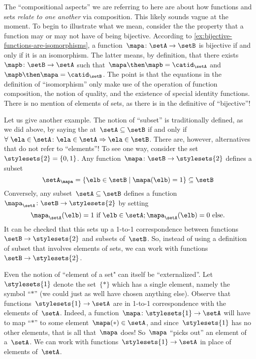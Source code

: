 The ``compositional aspects'' we are referring to here are about how functions and sets \emph{relate to one another} via composition.
This likely sounds vague at the moment.
To begin to illustrate what we mean, consider the the property that a function may or may not have of being bijective.
According to \cref{ex:bijective-functions-are-isomorphisms}, a function~$\mapa\colon \setA \to \setB$ is bijective if and only if it is an isomorphism.
The latter means, by definition, that there exists~$\mapb \colon \setB \to \setA$ such that~$\mapa \then \mapb = \catid_\setA$ and~$\mapb \then \mapa = \catid_\setB$.
The point is that the equations in the definition of ``isomorphism'' only make use of the operation of function composition, the notion of quality, and the existence of special identity functions.
There is no mention of elements of sets, as there is in the definitive of ``bijective''!

Let us give another example.
The notion of ``subset'' is traditionally defined, as we did above, by saying the at~$\setA \subseteq \setB$ if and only if~$\forall \ \ela \in \setA \colon \ela \in \setA \Rightarrow \ela \in \setB$.
There are, however, alternatives that do not refer to ``elements''!
To see one way, consider the set~$\stylesets{2} = \{ 0, 1\}$.
Any function~$\mapa \colon \setB \to \stylesets{2}$ defines a subset
\begin{equation*}
    \setA_\mapa = \{ \elb \in \setB \mid \mapa(\elb) = 1 \} \subseteq \setB
\end{equation*}
Conversely, any subset~$\setA \subseteq \setB$ defines a function~$\mapa_\setA \colon \setB \to \stylesets{2}$ by setting
\begin{equation*}
    \mapa_\setA(\elb) = 1 \text{ if } \elb \in \setA; \mapa_\setA(\elb) = 0 \text{ else}.
\end{equation*}
It can be checked that this sets up a 1-to-1 correspondence between functions~$\setB \to \stylesets{2}$ and subsets of~$\setB$.
So, instead of using a definition of subset that involves elements of sets, we can work with functions~$\setB \to \stylesets{2}$.

Even the notion of ``element of a set" can itself be ``externalized''.
Let~$\stylesets{1}$ denote the set~$\{ * \}$ which has a single element, namely the symbol ``$*$'' (we could just as well have chosen anything else).
Observe that functions~$\stylesets{1} \to \setA$ are in 1-to-1 correspondence with the elements of~$\setA$.
Indeed, a function~$\mapa\colon \stylesets{1} \to \setA$ will have to map ``$*$'' to some element~$\mapa(*) \in \setA$, and since~$\stylesets{1}$ has no other elements, that is all that~$\mapa$ does!
So~$\mapa$ ``picks out'' an element of a~$\setA$.
We can work with functions~$\stylesets{1} \to \setA$ in place of elements of~$\setA$.

